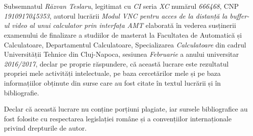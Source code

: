 \documentclass[12pt,a4paper,twoside,openright]{report}
\renewcommand{\thesisauthor}{Răzvan Teslaru}    %
\renewcommand{\thesismonth}{Februarie}     %
\renewcommand{\thesistitle}{Modul VNC pentru acces de la distanță la buffer-ul video al unui calculator prin interfața AMT} %
\begin{document}
\begin{titlepage}
\phantom{1}
\end{titlepage}



\begin{titlepage}

\begin{center}
\thispagestyle{firststylewithfooter}


{\scshape \facultynameromanian} \\
{\scshape \departmentnameromanian} \\
\end{center}

\vspace{3cm}

\begin{center}
\autheticitydeclarationsize \textbf{\autheticitydeclarationromanian}
\end{center}

\vspace{1cm}

Subsemnatul \textit{\thesisauthor}, legitimat cu \textit{CI} seria \textit{XC} numărul \textit{666468}, CNP \textit{1910917045353}, autorul lucrării \textit{\thesistitle} elaborată în vederea susținerii examenului de finalizare a studiilor de masterat la Facultatea de Automatică și Calculatoare, Departamentul Calculatoare, Specializarea \textit{Calculatoare} din cadrul Universității Tehnice din Cluj-Napoca, sesiunea \textit{\thesismonth} a anului universitar \textit{2016/2017}, declar pe proprie răspundere, că această lucrare este rezultatul propriei mele activități intelectuale, pe baza cercetărilor mele și pe baza informațiilor obținute din surse care au fost citate în textul lucrării și în bibliografie.

Declar că această lucrare nu conține porțiuni plagiate, iar sursele bibliografice au fost folosite cu respectarea legislației române și a convențiilor internaționale privind drepturile de autor.


\end{titlepage}
\end{document}
